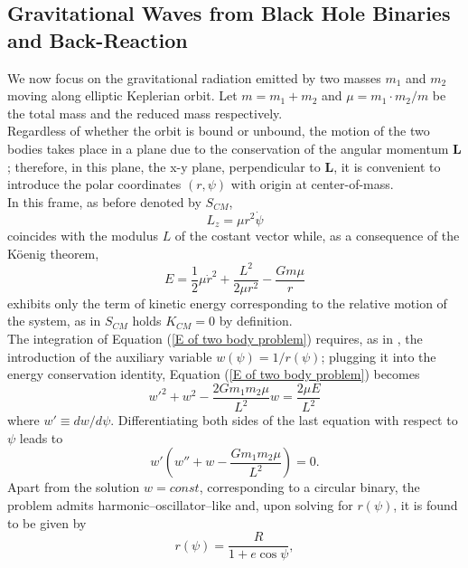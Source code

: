 \documentclass[12pt,twoside,openany]{book}
\begin{document}
\subsection{Gravitational Waves from Black Hole Binaries and Back-Reaction}
We now focus on the gravitational radiation emitted by two masses $m_1$ and $m_2$ moving along elliptic Keplerian orbit. Let $m=m_1+m_2$ and $\mu=m_1\cdot m_2/{m}$ be the total mass and the reduced mass respectively.\\Regardless of whether the orbit is bound or unbound, the motion of the two bodies takes place in a plane due to the conservation of the angular momentum $\mathbf{L}$; therefore, in this plane, the x-y plane, perpendicular to $\mathbf{L}$, it is convenient to  
introduce the polar coordinates $(r,\psi)$ with origin at center-of-mass.\\In this frame, as before denoted by $S_{CM}$, 
\begin{equation}\label{L of two body problem}
    L_z=\mu r^2\dot{\psi}
\end{equation}
coincides with the modulus $L$ of the costant vector while, as a consequence of the Köenig theorem,
\begin{equation}\label{E of two body problem}
    E=\frac{1}{2}\mu \dot{r}^2+\frac{L^2}{2\mu r^2}-\frac{Gm\mu}{r}
\end{equation}
exhibits only the term of kinetic energy corresponding to the relative motion of the system, as in $S_{CM}$ holds $K_{CM}=0$ by definition.\\The integration of Equation (\ref{E of two body problem}) requires, as in \parencite{Capozziello_2008}, the introduction of the auxiliary variable $w(\psi)=1/r(\psi)$; plugging it into the energy conservation identity, Equation (\ref{E of two body problem}) becomes 
\begin{equation}
    w'^2+w^2-\frac{2Gm_1m_2\mu}{L^2}w=\frac{2\mu E}{L^2}
\end{equation}
where $w'\equiv dw/d\psi$. Differentiating both sides of the last equation with respect to $\psi$ leads to
\begin{equation}\label{u differential equation}
    w'\left(w''+w-\frac{Gm_1m_2\mu}{L^2}\right)=0.
\end{equation}
Apart from the solution $w=const$, corresponding to a circular binary, the problem admits harmonic–oscillator–like and, upon solving for $r(\psi)$, it is found to be given by
\begin{equation}\label{two-body solution}
    r(\psi)=\frac{R}{1+e\cos{\psi}},
\end{equation}
\end{document}
